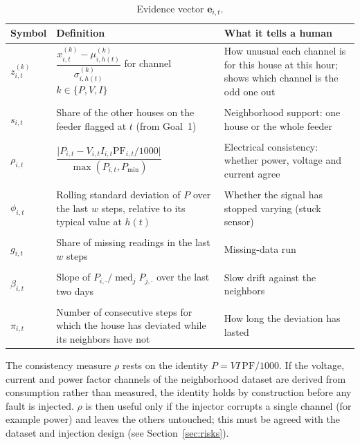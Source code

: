 \documentclass[11pt,a4paper]{article}
\begin{document}
\begin{table}[H]
\centering
\small
\begin{tabularx}{\textwidth}{@{}>{\raggedright\arraybackslash}p{1.5cm}>{\raggedright\arraybackslash}p{5.8cm}L@{}}
\toprule
\textbf{Symbol} & \textbf{Definition} & \textbf{What it tells a human} \\
\midrule
$z^{(k)}_{i,t}$ & $\dfrac{x^{(k)}_{i,t}-\mu^{(k)}_{i,h(t)}}{\sigma^{(k)}_{i,h(t)}}$ for channel $k\in\{P,V,I\}$ & How unusual each channel is for this house at this hour; shows which channel is the odd one out \\ \\[6pt] 
$s_{i,t}$ & Share of the other houses on the feeder flagged at $t$ (from Goal~1) & Neighborhood support: one house or the whole feeder \\ \\[6pt]
$\rho_{i,t}$ & $\dfrac{\bigl|P_{i,t}-V_{i,t}I_{i,t}\mathrm{PF}_{i,t}/1000\bigr|}{\max(P_{i,t},P_{\min})}$ & Electrical consistency: whether power, voltage and current agree \\ \\[6pt]
$\phi_{i,t}$ & Rolling standard deviation of $P$ over the last $w$ steps, relative to its typical value at $h(t)$ & Whether the signal has stopped varying (stuck sensor) \\ \\[6pt]
$g_{i,t}$ & Share of missing readings in the last $w$ steps & Missing-data run \\ \\[2pt]
$\beta_{i,t}$ & Slope of $P_{i,\cdot}/\operatorname{med}_{j}P_{j,\cdot}$ over the last two days & Slow drift against the neighbors \\ \\[6pt]
$\pi_{i,t}$ & Number of consecutive steps for which the house has deviated while its neighbors have not & How long the deviation has lasted \\
\bottomrule
\end{tabularx}
\caption{Evidence vector $\mathbf{e}_{i,t}$.}
\label{tab:evidence}
\end{table}

The consistency measure $\rho$ rests on the identity $P=VI\,\mathrm{PF}/1000$. If the voltage, current and
power factor channels of the neighborhood dataset are derived from consumption rather than measured, the
identity holds by construction before any fault is injected. $\rho$ is then useful only if the injector
corrupts a single channel (for example power) and leaves the others untouched; this must be agreed with the
dataset and injection design (see Section~\ref{sec:risks}).
\end{document}
